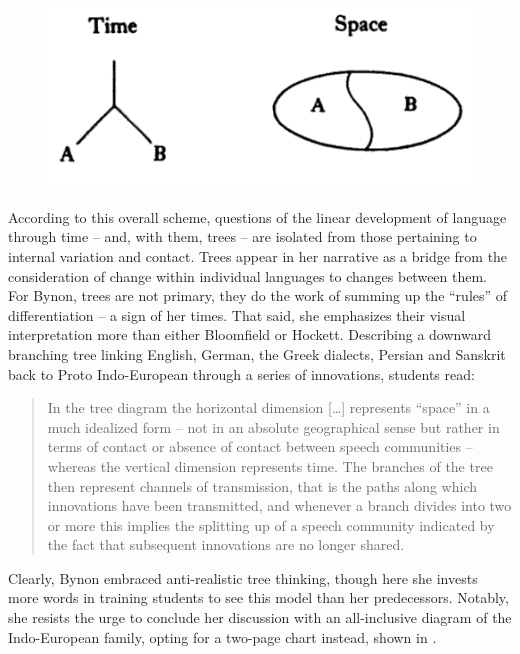 \documentclass[output=paper]{langscibook}
\begin{document}
\begin{figure}
    \centering
    \includegraphics[scale=0.6]{figures/bynon1977-new.png}
    \caption{\citet[173]{Bynon1977}}
    \label{fig:kaplan:bynon1977}
\end{figure}

According to this overall scheme, questions of the linear development of language through time -- and, with them, trees -- are isolated from those pertaining to internal variation and contact. Trees appear in her narrative as a bridge from the consideration of change within individual languages to changes between them. For Bynon, trees are not primary, they do the work of summing up the ``rules'' of differentiation -- a sign of her times. That said, she emphasizes their visual interpretation more than either Bloomfield or Hockett. Describing a downward branching tree linking English, German, the Greek dialects, Persian and Sanskrit back to Proto Indo-European through a series of innovations, students read:

\begin{quotation}
In the tree diagram the horizontal dimension […] represents ``space'' in a much idealized form -- not in an absolute geographical sense but rather in terms of contact or absence of contact between speech communities -- whereas the vertical dimension represents time. The branches of the tree then represent channels of transmission, that is the paths along which innovations have been transmitted, and whenever a branch divides into two or more this implies the splitting up of a speech community indicated by the fact that subsequent innovations are no longer shared. \citep[66]{Bynon1977}
\end{quotation}

Clearly, Bynon embraced anti-realistic tree thinking, though here she invests more words in training students to see this model than her  predecessors. Notably, she resists the urge to conclude her discussion with an all-inclusive diagram of the Indo-European family, opting for a two-page chart instead, shown in .
\end{document}
